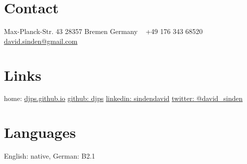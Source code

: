 \documentclass[english]{cv-style}
\begin{document}
\settowidth{\bwidth}{BSc}
\settowidth{\mwidth}{MSc}
\settowidth{\pwidth}{PhD}

\setlength{\diffbwidth}{\mwidth - \bwidth}
\setlength{\diffpwidth}{\mwidth - \pwidth}

\lastupdated

\begin{aside}
%
\section{Contact}\vspace{0.5\baselineskip}
Max-Planck-Str. 43
28357 Bremen
Germany
~
+49 176 343 68520
~
\href{mailto:david.sinden@gmail.com}{david.sinden@gmail.com}
%
\section{Links}\vspace{0.5\baselineskip}
home: \href{https://djps.github.io}{djps.github.io}\vspace{0.5\baselineskip}
%
\href{https://github.com/djps}{github: djps}\vspace{0.5\baselineskip}
%
\href{https://www.linkedin.com/in/sindendavid/}{linkedin: sindendavid}\vspace{0.5\baselineskip}
%
\href{https://x.com/david_sinden}{twitter: @david\_{}sinden}
%
%
\section{Languages}\vspace{0.5\baselineskip}
%
English: native, German: B2.1%
%

\end{aside}
\end{document}
